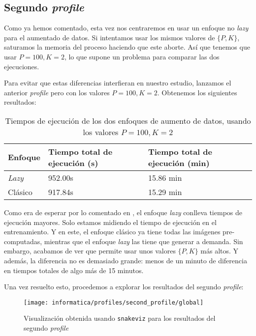 \subsection{Segundo \textit{profile}}

Como ya hemos comentado, esta vez nos centraremos en usar un enfoque no \textit{lazy} para el aumentado de datos. Si intentamos usar los mismos valores de $\{P, K\}$, saturamos la memoria del proceso haciendo que este aborte. Así que tenemos que usar $P = 100, K = 2$, lo que supone un problema para comparar las dos ejecuciones.

Para evitar que estas diferencias interfieran en nuestro estudio, lanzamos el anterior \textit{profile} pero con los valores $P = 100, K = 2$. Obtenemos los siguientes resultados:

\begin{table}[H]
\centering
\begin{tabular}{|l|l|l|}
    \hline
    \textbf{Enfoque} & \textbf{Tiempo total de ejecución (s)} & \textbf{Tiempo total de ejecución (min)} \\
    \hline

    \textit{Lazy} & 952.00s & 15.86 min \\
    Clásico       & 917.84s & 15.29 min \\

    \hline

\end{tabular}
\caption{Tiempos de ejecución de los dos enfoques de aumento de datos, usando los valores $P = 100, K = 2$}
\end{table}

Como era de esperar por lo comentado en , el enfoque \textit{lazy} conlleva tiempos de ejecución mayores. Solo estamos midiendo el tiempo de ejecución en el entrenamiento. Y en este, el enfoque clásico ya tiene todas las imágenes pre-computadas, mientras que el enfoque \textit{lazy} las tiene que generar a demanda. Sin embargo, acabamos de ver que permite usar unos valores $\{P, K\}$ más altos. Y además, la diferencia no es demasiado grande: menos de un minuto de diferencia en tiempos totales de algo más de 15 minutos.

Una vez resuelto esto, procedemos a explorar los resultados del segundo \textit{profile}:

\begin{figure}[H]
    \centering
    \texttt{[image: informatica/profiles/second\_profile/global]}
    \caption{Visualización obtenida usando \lstinline{snakeviz} para los resultados del segundo \textit{profile}}
\end{figure}

